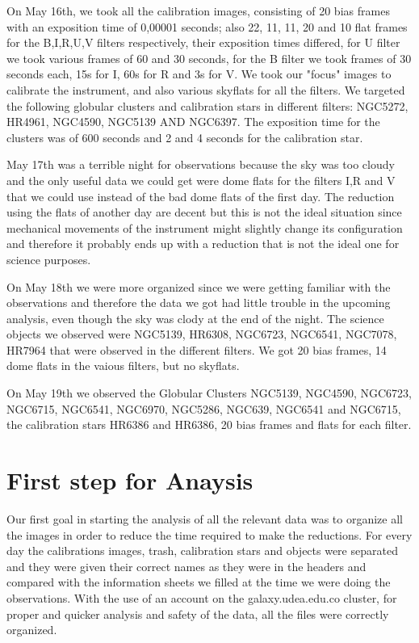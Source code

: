 On May 16th, we took all the calibration images, consisting of 20 bias frames with an exposition time of 0,00001 seconds; also 22, 11, 11, 20 and 10 flat frames for the B,I,R,U,V filters respectively, their exposition times differed, for  U filter we took various frames of 60 and 30 seconds, for the B filter we took frames of 30 seconds each, 15s for I, 60s for R and 3s for V. We took our "focus" images to calibrate the instrument, and also various skyflats for all the filters. We targeted the following globular clusters and calibration stars in different filters: NGC5272, HR4961, NGC4590, NGC5139 AND NGC6397. The exposition time for the clusters was of 600 seconds and 2 and 4 seconds for the calibration star. 

May 17th was a terrible night for observations because the sky was too cloudy and the only useful data we could get were dome flats for the filters I,R and V that we could use instead of the bad dome flats of the first day. The reduction using the flats of another day are decent but this is not the ideal situation since mechanical movements of the instrument might slightly change its configuration and therefore it probably ends up with a reduction that is not the ideal one for science purposes.  

On May 18th we were more organized since we were getting familiar with the observations and therefore the data we got had little trouble in the upcoming analysis, even though the sky was clody at the end of the night. The science objects we observed were NGC5139, HR6308, NGC6723, NGC6541, NGC7078, HR7964 that were observed in the different filters. We got 20 bias frames, 14 dome flats in the vaious filters, but no skyflats. 

On May 19th we observed the Globular Clusters NGC5139, NGC4590, NGC6723, NGC6715, NGC6541, NGC6970, NGC5286, NGC639, NGC6541 and NGC6715, the calibration stars HR6386 and HR6386, 20 bias frames and flats for each filter.

\section{First step for Anaysis}

Our first goal in starting the analysis of all the relevant data was to organize all the images in order to reduce the time required to make the reductions. For every day the calibrations images, trash, calibration stars and objects were separated and they were given their correct names as they were in the headers and compared with the information sheets we filled at the time we were doing the observations. With the use of an account on the galaxy.udea.edu.co cluster, for proper and quicker analysis and safety of the data, all the files were correctly organized.

